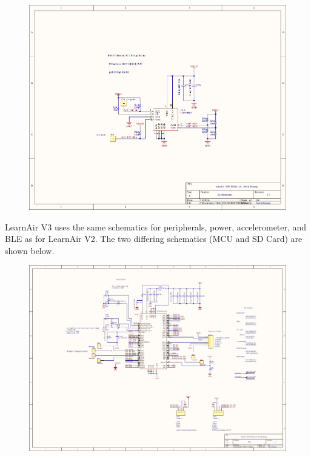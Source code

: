 \begin{figure}[htb]
 	\includegraphics[width=\textwidth + \marginparwidth]{schematics/la_schematic6}               
\end{figure}

\FloatBarrier
LearnAir V3 uses the same schematics for peripherals, power, accelerometer, and BLE as for LearnAir V2.  The two differing schematics (MCU and SD Card) are shown below. 
\FloatBarrier

\begin{figure}[htb]
 	\includegraphics[width=\textwidth + \marginparwidth]{schematics/l3_schematic1}            
\end{figure}

